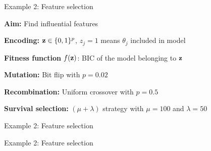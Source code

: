 \documentclass[11pt,compress,t,notes=noshow, xcolor=table]{beamer}
\begin{document}
\begin{framei}{Example 2: Feature selection}
\item \textbf{Aim:} Find influential features
\item \textbf{Encoding:} $\mathbf{z} \in \{0, 1\}^p$, $z_j = 1$ means $\theta_j$ included in model
\item \textbf{Fitness function} $f(\mathbf{z})$: BIC of the model belonging to $\mathbf{z}$
\item \textbf{Mutation:} Bit flip with $p = 0.02$
\item \textbf{Recombination:} Uniform crossover with $p=0.5$
\item \textbf{Survival selection:} $(\mu + \lambda)$ strategy with $\mu = 100$ and $\lambda =50$
\vfill
{}
\end{framei}


\begin{framev}{Example 2: Feature selection}
\end{framev}


\begin{framev}{Example 2: Feature selection}
\end{framev}

\endlecture
\end{document}
